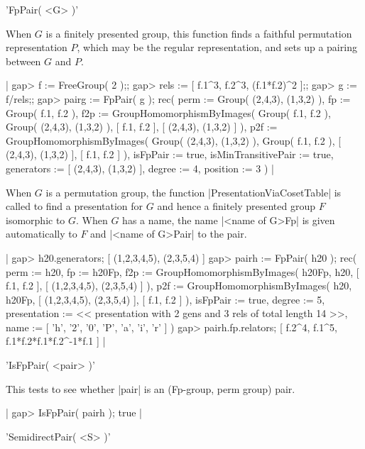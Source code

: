 'FpPair( <G> )'

When $G$ is a finitely presented group, this function finds a faithful
permutation     representation  $P$,   which    may    be  the regular
representation, and sets up a pairing between $G$ and $P$.

|    gap> f := FreeGroup( 2 );;
    gap> rels := [ f.1^3, f.2^3, (f.1*f.2)^2 ];;
    gap> g := f/rels;;
    gap> pairg := FpPair( g );
    rec(
      perm := Group( (2,4,3), (1,3,2) ),
      fp := Group( f.1, f.2 ),
      f2p := GroupHomomorphismByImages( Group( f.1, f.2 ), 
        Group( (2,4,3), (1,3,2) ), [ f.1, f.2 ], [ (2,4,3), (1,3,2) ] ),
      p2f := GroupHomomorphismByImages( Group( (2,4,3), (1,3,2) ),
        Group( f.1, f.2 ), [ (2,4,3), (1,3,2) ], [ f.1, f.2 ] ),
      isFpPair := true,
      isMinTransitivePair := true,
      generators := [ (2,4,3), (1,3,2) ],
      degree := 4,
      position := 3 )  |

When     $G$   is      a    permutation     group,     the    function
|PresentationViaCosetTable| is called  to find a presentation  for $G$
and hence a finitely presented group $F$  isomorphic to $G$.  When $G$
has a name, the name |<name of G>Fp| is given automatically to $F$ and
|<name of G>Pair| to the pair.

|    gap> h20.generators;
    [ (1,2,3,4,5), (2,3,5,4) ]
    gap> pairh := FpPair( h20 );
    rec(
      perm := h20,
      fp := h20Fp,
      f2p := GroupHomomorphismByImages( h20Fp, h20, [ f.1, f.2 ], 
        [ (1,2,3,4,5), (2,3,5,4) ] ),
      p2f := GroupHomomorphismByImages( h20, h20Fp,
        [ (1,2,3,4,5), (2,3,5,4) ], [ f.1, f.2 ] ),
      isFpPair := true,
      degree := 5,
      presentation := << presentation with 2 gens and 3 rels
        of total length 14 >>,
      name := [ 'h', '2', '0', 'P', 'a', 'i', 'r' ] )
    gap> pairh.fp.relators;
    [ f.2^4, f.1^5, f.1*f.2*f.1*f.2^-1*f.1 ]   |


%

'IsFpPair( <pair> )'

This tests to see whether |pair| is an (Fp-group, perm group) pair.

|    gap> IsFpPair( pairh );
    true |

%

'SemidirectPair( <S> )'

